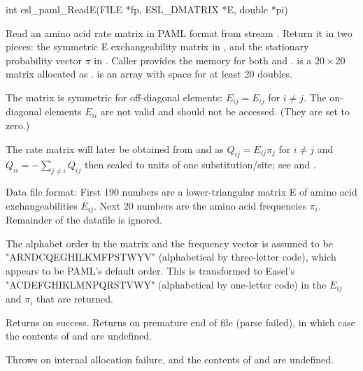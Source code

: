 \begin{sreapi}
\hypertarget{func:esl_paml_ReadE()}
{\item[int esl\_paml\_ReadE(FILE *fp, ESL\_DMATRIX *E, double *pi)]}

Read an amino acid rate matrix in PAML format from stream
. Return it in two pieces: the symmetric E
exchangeability matrix in , and the stationary
probability vector $\pi$ in .
Caller provides the memory for both  and .  
is a $20 \times 20$ matrix allocated as
.  is an array with
space for at least 20 doubles.

The  matrix is symmetric for off-diagonal elements:
$E_{ij} = E_{ij}$ for $i \neq j$.  The on-diagonal
elements $E_{ii}$ are not valid and should not be
accessed.  (They are set to zero.)

The rate matrix will later be obtained from 
and  as 
$Q_{ij} = E_{ij} \pi_j$ for $i \neq j$ 
and
$Q_{ii} = -\sum_{j \neq i} Q_{ij}$ 
then scaled to units of one
substitution/site; see  and
.

Data file format: First 190 numbers are a
lower-triangular matrix E of amino acid
exchangeabilities $E_{ij}$. Next 20 numbers are the
amino acid frequencies $\pi_i$. Remainder of the
datafile is ignored.

The alphabet order in the matrix and the frequency
vector is assumed to be "ARNDCQEGHILKMFPSTWYV"
(alphabetical by three-letter code), which appears to be
PAML's default order. This is transformed to Easel's
"ACDEFGHIKLMNPQRSTVWY" (alphabetical by one-letter code)
in the $E_{ij}$ and $\pi_i$ that are returned.

Returns  on success.
Returns  on premature end of file (parse failed), in which
case the contents of  and  are undefined.

Throws  on internal allocation failure,
and the contents of  and  are undefined.



\end{sreapi}

